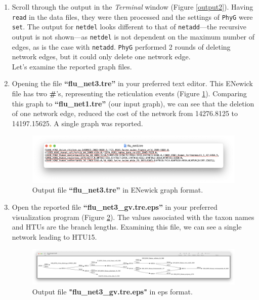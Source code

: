 \documentclass[11pt]{article}
\newcommand{\phyg}{\texttt{PhyG} }
\begin{document}
\begin {enumerate}
\item Scroll through the output in the \textit{Terminal} window (Figure \ref{output2}). 
Having \texttt{read} in the data files, they were then processed and the settings of 
\phyg were \texttt{set}. The output for \texttt{netdel} looks different to that of 
\texttt{netadd}---the recursive output is not shown---as \texttt{netdel} is not dependent 
on the maximum number of edges, as is the case with \texttt{netadd}. \phyg performed 
2 rounds of deleting network edges, but it could only delete one network edge.\\

Let's examine the reported graph files. 

\item Opening the file \textbf{``flu\_net3.tre''} in your preferred text editor. This 
ENewick file has two \textbf{\#}'s, representing the reticulation events (Figure 
\ref{tre3}). Comparing this graph to \textbf{``flu\_net1.tre''} (our input graph), we can 
see that the deletion of one network edge, reduced the cost of the network from 
14276.8125 to 14197.15625. A single graph was reported.

\begin{figure}[H]
\centering
\includegraphics[width=\textwidth]{tre3.png}
\caption{Output file \textbf{``flu\_net3.tre''} in ENewick graph format.}
\label{tre3}
\end{figure}

\item  Open the reported file \textbf{``flu\_net3\_gv.tre.eps''} in your preferred
visualization program (Figure \ref{eps3}). The values associated with the taxon 
names and HTUs are the branch lengths. Examining this file, we can see a single
network leading to HTU15.

\begin{figure}[H]
\centering
\includegraphics[width=\textwidth]{eps3.png}
\caption{Output file \textbf{"flu\_net3\_gv.tre.eps"} in eps format.}
\label{eps3}
\end{figure}


\end{enumerate}
\end{document}
